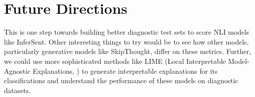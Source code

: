 \documentclass[10pt,letterpaper]{article}
\begin{document}

\section{Future Directions}

This is one step towards building better diagnostic test sets to score NLI models like InferSent. Other interesting things to try would be to see how other models, particularly generative models like SkipThought, differ on these metrics. Further, we could use more sophisticated methods like LIME (Local Interpretable Model-Agnostic Explanations, \cite{ribeiro2016should}) to generate interpretable explanations for its classifications and understand the performance of these models on diagnostic datasets. 



\end{document}
